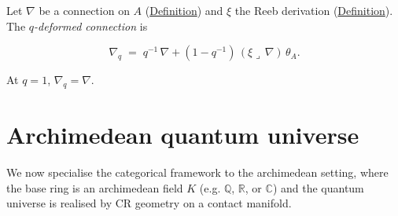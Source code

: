 \begin{definition}
  \label{def:categorical-q-connection}
Let $\nabla$ be a connection on $A$
(\hyperref[def:categorical-connection]{Definition}) and $\xi$ the Reeb
derivation (\hyperref[def:categorical-reeb]{Definition}).  The
\emph{$q$-deformed connection} is

\[
\nabla_q \;=\; q^{-1}\,\nabla
  + (1 - q^{-1})\,(\xi \lrcorner\, \nabla)\,\theta_A.
\]

At $q = 1$, $\nabla_q = \nabla$.
\end{definition}

\section{Archimedean quantum universe}
\label{sec:archimedean-qou}

We now specialise the categorical framework to the archimedean setting,
where the base ring is an archimedean field $K$ (e.g.
$\mathbb{Q}$, $\mathbb{R}$, or $\mathbb{C}$) and the quantum universe
is realised by CR geometry on a contact manifold.

